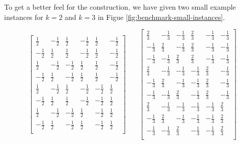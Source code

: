To get a better feel for the construction, we have given two small example instances for $k=2$ and $k=3$ in Figue \cref{fig:benchmark-small-instances}.
\begin{figure*}[h]
\begin{center}
$$ 
\begin{bmatrix}
\frac{1}{2} & -\frac{1}{2} & \frac{1}{2} & -\frac{1}{2} & \frac{1}{2} & -\frac{1}{2}  \\
-\frac{1}{2} & \frac{1}{2} & \frac{1}{2} & -\frac{1}{2} & \frac{1}{2} & -\frac{1}{2} \\
\frac{1}{2} & -\frac{1}{2} & -\frac{1}{2} & \frac{1}{2} & \frac{1}{2} & -\frac{1}{2}  \\
-\frac{1}{2} & \frac{1}{2} & -\frac{1}{2} & \frac{1}{2} & \frac{1}{2} & -\frac{1}{2} \\
\frac{1}{2} & -\frac{1}{2} & \frac{1}{2} & -\frac{1}{2} & -\frac{1}{2} & \frac{1}{2}  \\
-\frac{1}{2} & \frac{1}{2} & \frac{1}{2} & -\frac{1}{2} & -\frac{1}{2} & \frac{1}{2}  \\
\frac{1}{2} & -\frac{1}{2} & -\frac{1}{2} & \frac{1}{2} &-\frac{1}{2} & \frac{1}{2} \\
-\frac{1}{2} & \frac{1}{2} & -\frac{1}{2} & \frac{1}{2}  & -\frac{1}{2} & \frac{1}{2} \\
\end{bmatrix} ~~~~~~~~
\begin{bmatrix}
 \frac{2}{3}   & -\frac{1}{3}  & -\frac{1}{3} & \frac{2}{3}   & -\frac{1}{3}  & -\frac{1}{3}   \\
 -\frac{1}{3}  & \frac{2}{3}   & -\frac{1}{3} & \frac{2}{3}   & -\frac{1}{3}  & -\frac{1}{3}   \\
 -\frac{1}{3}  & -\frac{1}{3}  & \frac{2}{3}  & \frac{2}{3}   & -\frac{1}{3}  & -\frac{1}{3}   \\
 \frac{2}{3}   & -\frac{1}{3}  & -\frac{1}{3} & -\frac{1}{3}  & \frac{2}{3}   & -\frac{1}{3}   \\
 -\frac{1}{3}  & \frac{2}{3}   & -\frac{1}{3} & -\frac{1}{3}  & \frac{2}{3}   & -\frac{1}{3}   \\
 -\frac{1}{3}  & -\frac{1}{3}  & \frac{2}{3}  & -\frac{1}{3}  & \frac{2}{3}   &  -\frac{1}{3}  \\
 \frac{2}{3}   & -\frac{1}{3}  & -\frac{1}{3} & -\frac{1}{3}  & -\frac{1}{3}  & \frac{2}{3}    \\
 -\frac{1}{3}  & \frac{2}{3}   & -\frac{1}{3} & -\frac{1}{3}  & -\frac{1}{3}  & \frac{2}{3}    \\
 -\frac{1}{3}  & -\frac{1}{3}  & \frac{2}{3}  & -\frac{1}{3}  & -\frac{1}{3}  & \frac{2}{3}    \\
\end{bmatrix} 
$$
\end{center}
\caption{Benchmark construction for $k=2$ and $\alpha=3$ (left) and $k=3$ and $\alpha=2$ (right).}
\label{fig:benchmark-small-instances}
\end{figure*}


